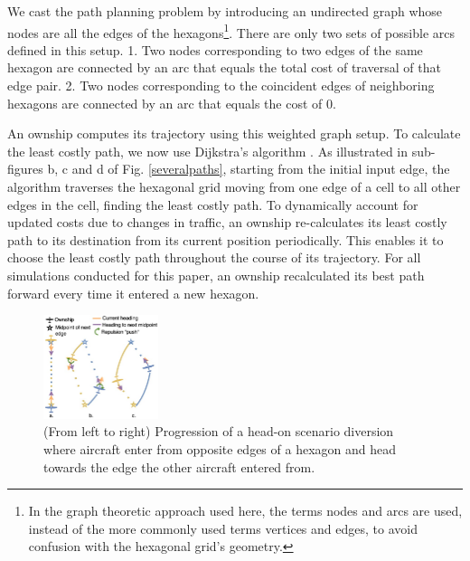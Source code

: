 \documentclass[conference, letter]{IEEEtran}
\newcommand{\aj}[1]{ \textcolor{blue}{\textsc{AJ:} #1  }}
\begin{document}
We cast the path planning problem by introducing an undirected graph \cite{b16} whose nodes are all the edges of the hexagons\footnote{In the graph theoretic approach used here, the terms nodes and arcs are used, instead of the more commonly used terms vertices and edges, to avoid confusion with the hexagonal grid's geometry.}. There are only two sets of possible arcs defined in this setup. 1. Two nodes corresponding to two edges of the same hexagon are connected by an arc that equals the total cost of traversal of that edge pair. 2. Two nodes corresponding to the coincident edges of neighboring hexagons are connected by an arc that equals the cost of 0. 


An ownship computes its trajectory using this weighted graph setup. To calculate the least costly path, we now use Dijkstra's algorithm \cite{b9}. As illustrated in sub-figures b, c and d of Fig. \ref{severalpaths}, starting from the initial input edge, the algorithm traverses the hexagonal grid moving from one edge of a cell to all other edges in the cell, finding the least costly path. To dynamically account for updated costs due to changes in traffic, an ownship re-calculates its least costly path to its destination from its current position periodically. This enables it to choose the least costly path throughout the course of its trajectory. For all simulations conducted for this paper, an ownship recalculated its best path forward every time it entered a new hexagon. 


\begin{figure}[hbt!]
\centering
\includegraphics[width=0.3\textwidth]{progression.jpg}
\caption{(From left to right) Progression of a head-on scenario diversion where aircraft enter from opposite edges of a hexagon and head towards the edge the other aircraft entered from.}
\label{progress}
\end{figure}
\end{document}
